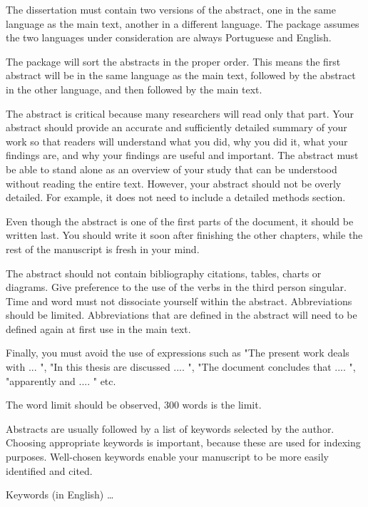 \abstractEN %

The dissertation must contain two versions of the abstract, one in the same language as the main text, another in a different language.  The package assumes the two languages under consideration are always Portuguese and English.

The package will sort the abstracts in the proper order. This means the first abstract will be in the same language as the main text, followed by the abstract in the other language, and then followed by the main text. 

The abstract is critical because many researchers will read only that part. Your abstract should provide an accurate and sufficiently detailed summary of your work so that readers will understand what you did, why you did it, what your findings are, and why your findings are useful and important. The abstract must be able to stand alone as an overview of your study that can be understood without reading the entire text. However, your abstract should not be overly detailed. For example, it does not need to include a detailed methods section.

Even though the abstract is one of the first parts of the document, it should be written last. You should write it soon after finishing the other chapters, while the rest of the manuscript is fresh in your mind. 

The abstract should not contain bibliography citations, tables, charts or diagrams. Give preference to the use of the verbs in the third person singular. Time and word must not dissociate yourself within the abstract. Abbreviations should be limited. Abbreviations that are defined in the abstract will need to be defined again at first use in the main text. 

Finally, you must avoid the use of expressions such as "The present work deals with ... ", "In this thesis are discussed .... ", "The document concludes that .... ", "apparently and .... " etc.

The word limit should be observed, 300 words is the limit.

Abstracts are usually followed by a list of keywords selected by the author. Choosing appropriate keywords is important, because these are used for indexing purposes. Well-chosen keywords enable your manuscript to be more easily identified and cited. 

\begin{keywords}
Keywords (in English) \ldots
\end{keywords} 
